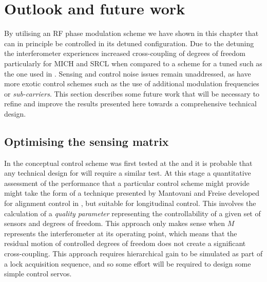 \section{Outlook and future work}
By utilising an \gls{RF} phase modulation scheme we have shown in this chapter that \ETLF{} can in principle be controlled in its detuned configuration. Due to the detuning the interferometer experiences increased cross-coupling of degrees of freedom particularly for \gls{MICH} and \gls{SRCL} when compared to a scheme for a tuned \DRFPMI{} such as the one used in \ALIGO{}. Sensing and control noise issues remain unaddressed, as have more exotic control schemes such as the use of additional modulation frequencies or \emph{sub-carriers}. This section describes some future work that will be necessary to refine and improve the results presented here towards a comprehensive technical design.

\subsection{Optimising the sensing matrix}
In \ALIGO{} the conceptual control scheme was first tested at the \CALTECHFORTYM{} and it is probable that any technical design for \ETLF{} will require a similar test. At this stage a quantitative assessment of the performance that a particular control scheme might provide might take the form of a technique presented by Mantovani and Freise \cite{Mantovani2008} developed for alignment control in \VIRGO{}, but suitable for longitudinal control. This involves the calculation of a \emph{quality parameter} representing the controllability of a given set of sensors and degrees of freedom. This approach only makes sense when $M$ represents the interferometer at its operating point, which means that the residual motion of controlled degrees of freedom does not create a significant cross-coupling. This approach requires hierarchical gain to be simulated as part of a lock acquisition sequence, and so some effort will be required to design some simple control servos.

